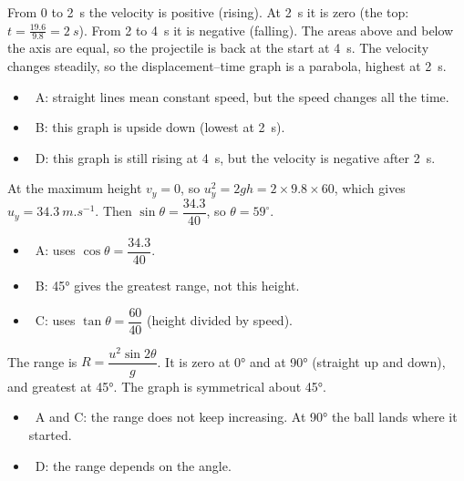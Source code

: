 \documentclass[12pt]{article}
\begin{document}
\begin{practiceanswers}
\begin{practiceans}
  From 0 to \qty{2}{s} the velocity is positive (rising). At \qty{2}{s} it is zero (the top:
  $t = \frac{19.6}{9.8} = \qty{2}{s}$).
  From 2 to \qty{4}{s} it is negative (falling). The areas above and below the axis are equal, so
  the projectile is back at the start at \qty{4}{s}. The velocity changes steadily, so the
  displacement--time graph is a parabola, highest at \qty{2}{s}.
  \begin{itemize}
    \item \xmark\ A: straight lines mean constant speed, but the speed changes all the time.
    \item \xmark\ B: this graph is upside down (lowest at \qty{2}{s}).
    \item \xmark\ D: this graph is still rising at \qty{4}{s}, but the velocity is negative after
          \qty{2}{s}.
  \end{itemize}
\end{practiceans}

\begin{practiceans}
  At the maximum height $v_y = 0$, so $u_y^2 = 2gh = 2 \times 9.8 \times 60$, which gives
  $u_y = \qty{34.3}{m.s^{-1}}$. Then $\sin\theta = \dfrac{34.3}{40}$, so $\theta = 59^\circ$.
  \begin{itemize}
    \item \xmark\ A: uses $\cos\theta = \dfrac{34.3}{40}$.
    \item \xmark\ B: \ang{45} gives the greatest range, not this height.
    \item \xmark\ C: uses $\tan\theta = \dfrac{60}{40}$ (height divided by speed).
  \end{itemize}
\end{practiceans}

\begin{practiceans}
  The range is $R = \dfrac{u^2\sin 2\theta}{g}$. It is zero at \ang{0} and at \ang{90} (straight up
  and down), and greatest at \ang{45}. The graph is symmetrical about \ang{45}.
  \begin{itemize}
    \item \xmark\ A and C: the range does not keep increasing. At \ang{90} the ball lands where it
          started.
    \item \xmark\ D: the range depends on the angle.
  \end{itemize}
\end{practiceans}


\end{practiceanswers}
\end{document}
